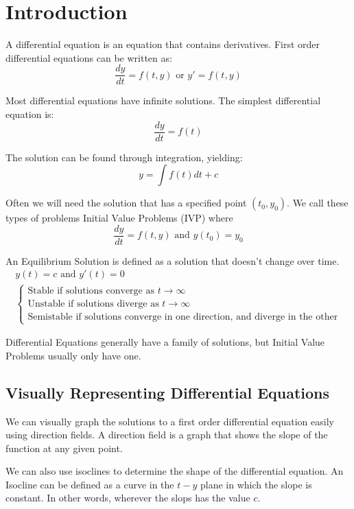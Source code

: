 \documentclass[12pt, landscape, twocolumn]{article}
\newcommand{\pren}[1]{\left(#1\right)}                    %
\begin{document}
\section{Introduction}
A differential equation is an equation that contains derivatives. First order differential equations can be written as:
\[ \frac{dy}{dt} = f \pren{t, y} \text{ or } y \prime = f \pren{t, y} \]

Most differential equations have infinite solutions. The simplest differential equation is:
\[ \frac{dy}{dt} = f \pren{t} \]

The solution can be found through integration, yielding:
\[ y = \int f \pren{t} dt + c \]

Often we will need the solution that has a specified point $(t_0, y_0)$. We call these types of problems Initial Value Problems (IVP) where
\[ \frac{dy}{dt} = f \pren{t, y} \text{ and } y(t_0)=y_0 \]

An Equilibrium Solution is defined as a solution that doesn't change over time.
\begin{equation}\label{eq:EquilibriumSolution}
    \begin{aligned}
    y(t) = c \text{ and } y\prime(t) = 0\\
        \begin{cases}
        \text{Stable if solutions converge as } t \to \infty \\
        \text{Unstable if solutions diverge as } t \to \infty \\
        \text{Semistable if solutions converge in one direction, and diverge in the other}
        \end{cases}
    \end{aligned}
\end{equation}

Differential Equations generally have a family of solutions, but Initial Value Problems usually only have one.

    \subsection{Visually Representing Differential Equations}\label{sec:visde}

    We can visually graph the solutions to a first order differential equation easily using direction fields. A direction field is a graph that shows the slope of the function at any given point.

    We can also use isoclines to determine the shape of the differential equation. An Isocline can be defined as a curve in the $t-y$ plane in which the slope is constant. In other words, wherever the slops has the value $c$.
\end{document}
